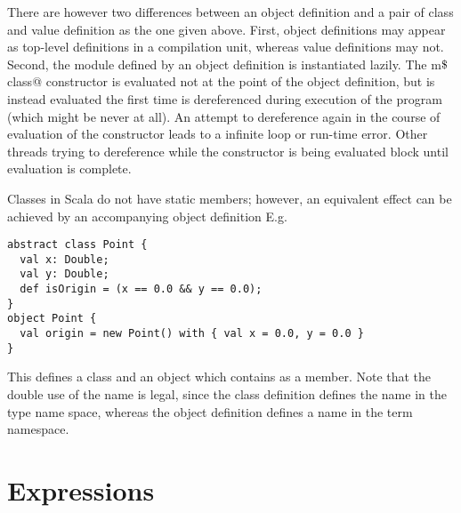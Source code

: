 \documentclass[11pt]{report}
\begin{document}
There are however two differences between an object definition and a
pair of class and value definition as the one given above.  First,
object definitions may appear as top-level definitions in a
compilation unit, whereas value definitions may not.  Second, the
module defined by an object definition is instantiated lazily.  The
\verb@new m$\Dollar$class@ constructor is evaluated not at the point
of the object definition, but is instead evaluated the first time \verb@m@
is dereferenced during execution of the program (which might be never
at all). An attempt to dereference \verb@m@ again in the course of
evaluation of the constructor leads to a infinite loop or run-time
error.  Other threads trying to dereference \verb@m@ while the constructor
is being evaluated block until evaluation is complete.

\example
Classes in Scala do not have static members; however, an equivalent
effect can be achieved by an accompanying object definition
E.g.
\begin{verbatim}
abstract class Point {
  val x: Double;
  val y: Double;
  def isOrigin = (x == 0.0 && y == 0.0);
}
object Point {
  val origin = new Point() with { val x = 0.0, y = 0.0 }
}
\end{verbatim}
This defines a class \verb@Point@ and an object \verb@Point@ which
contains \verb@origin@ as a member.  Note that the double use of the
name \verb@Point@ is legal, since the class definition defines the name
\verb@Point@ in the type name space, whereas the object definition
defines a name in the term namespace.


\chapter{Expressions}
\label{sec:exprs}
\end{document}
